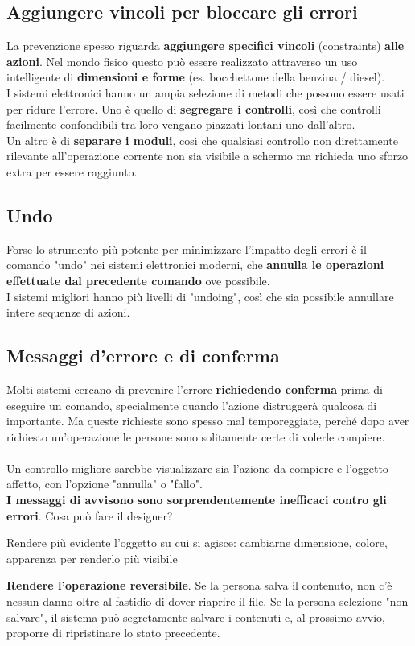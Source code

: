 \documentclass[10pt]{article}
\begin{document}
\subsection{Aggiungere vincoli per bloccare gli errori}
La prevenzione spesso riguarda \textbf{aggiungere specifici vincoli} (constraints) \textbf{alle azioni}. Nel mondo fisico questo può essere realizzato attraverso un uso intelligente di \textbf{dimensioni e forme} (es. bocchettone della benzina / diesel).\\
I sistemi elettronici hanno un ampia selezione di metodi che possono essere usati per ridure l'errore. Uno è quello di \textbf{segregare i controlli}, così che controlli facilmente confondibili tra loro vengano piazzati lontani uno dall'altro.\\
Un altro è di \textbf{separare i moduli}, così che qualsiasi controllo non direttamente rilevante all'operazione corrente non sia visibile a schermo ma richieda uno sforzo extra per essere raggiunto.
\subsection{Undo}
Forse lo strumento più potente per minimizzare l'impatto degli errori è il comando "undo" nei sistemi elettronici moderni, che \textbf{annulla le operazioni effettuate dal precedente comando} ove possibile.\\
I sistemi migliori hanno più livelli di "undoing", così che sia possibile annullare intere sequenze di azioni.
\subsection{Messaggi d'errore e di conferma}
Molti sistemi cercano di prevenire l'errore \textbf{richiedendo conferma} prima di eseguire un comando, specialmente quando l'azione distruggerà qualcosa di importante. Ma queste richieste sono spesso mal temporeggiate, perché dopo aver richiesto un'operazione le persone sono solitamente certe di volerle compiere.\\\\
Un controllo migliore sarebbe visualizzare sia l'azione da compiere e l'oggetto affetto, con l'opzione "annulla" o "fallo".\\
\textbf{I messaggi di avvisono sono sorprendentemente inefficaci contro gli errori}. Cosa può fare il designer?
\begin{list}{}{}
\item Rendere più evidente l'oggetto su cui si agisce: cambiarne dimensione, colore, apparenza per renderlo più visibile
\item \textbf{Rendere l'operazione reversibile}. Se la persona salva il contenuto, non c'è nessun danno oltre al fastidio di dover riaprire il file. Se la persona selezione "non salvare", il sistema può segretamente salvare i contenuti e, al prossimo avvio, proporre di ripristinare lo stato precedente.
\end{list}
\end{document}
